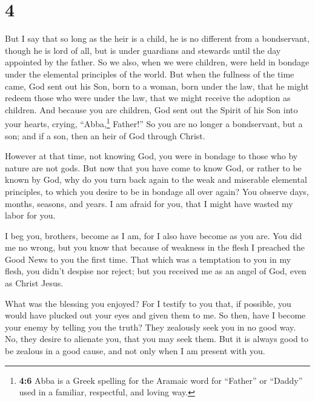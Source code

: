 \hypertarget{section-3}{%
\section{4}\label{section-3}}

 But I say that so long as the heir is a child, he is no
different from a bondservant, though he is lord of all, 
but is under guardians and stewards until the day appointed by the
father.  So we also, when we were children, were held in
bondage under the elemental principles of the world.  But
when the fullness of the time came, God sent out his Son, born to a
woman, born under the law,  that he might redeem those who
were under the law, that we might receive the adoption as children.
 And because you are children, God sent out the Spirit of
his Son into your hearts, crying, ``Abba,\footnote{\textbf{4:6} Abba is
  a Greek spelling for the Aramaic word for ``Father'' or ``Daddy'' used
  in a familiar, respectful, and loving way.} Father!'' 
So you are no longer a bondservant, but a son; and if a son, then an
heir of God through Christ.

 However at that time, not knowing God, you were in
bondage to those who by nature are not gods.  But now that
you have come to know God, or rather to be known by God, why do you turn
back again to the weak and miserable elemental principles, to which you
desire to be in bondage all over again?  You observe
days, months, seasons, and years.  I am afraid for you,
that I might have wasted my labor for you.

 I beg you, brothers, become as I am, for I also have
become as you are. You did me no wrong,  but you know
that because of weakness in the flesh I preached the Good News to you
the first time.  That which was a temptation to you in my
flesh, you didn't despise nor reject; but you received me as an angel of
God, even as Christ Jesus.

 What was the blessing you enjoyed? For I testify to you
that, if possible, you would have plucked out your eyes and given them
to me.  So then, have I become your enemy by telling you
the truth?  They zealously seek you in no good way. No,
they desire to alienate you, that you may seek them.  But
it is always good to be zealous in a good cause, and not only when I am
present with you.

